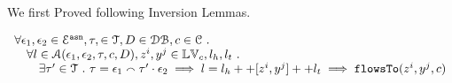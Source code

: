 \documentclass[a4paper,11pt]{article}
\begin{document}
We first Proved following Inversion Lemmas.

\clearpage

\begin{thm}[Correctness]
\label{thm:alg_correct}
\[
\begin{array}{l}
  \forall \mathtt{\epsilon}_1, \mathtt{\epsilon}_2 \in \mathcal{E}^{\mathtt{{asn}}}, \mathtt{\tau}, \in \mathcal{T}, D \in \mathcal{DB} , c \in \mathcal{C} ~.~ 
  \\ \quad 
   \forall l \in \mathcal{A}(\mathtt{\epsilon}_1, \mathtt{\epsilon}_2, \mathtt{\tau}, c, D), z^i, y^j \in \mathbb{LV}_c, l_h, l_t ~.~ 
  \\ \qquad 
   \exists \mathtt{\tau}' \in \mathcal{T} ~.~ \mathtt{\tau} = \mathtt{\epsilon}_1 \smallfrown \mathtt{\tau}' \cdot \mathtt{\epsilon}_2
   \implies 
   l = l_h ++ [z^i, y^j] ++ l_t 
   \implies \mathtt{flowsTo}(z^i, y^j, c)
\end{array}
\]
\end{thm}
\end{document}
